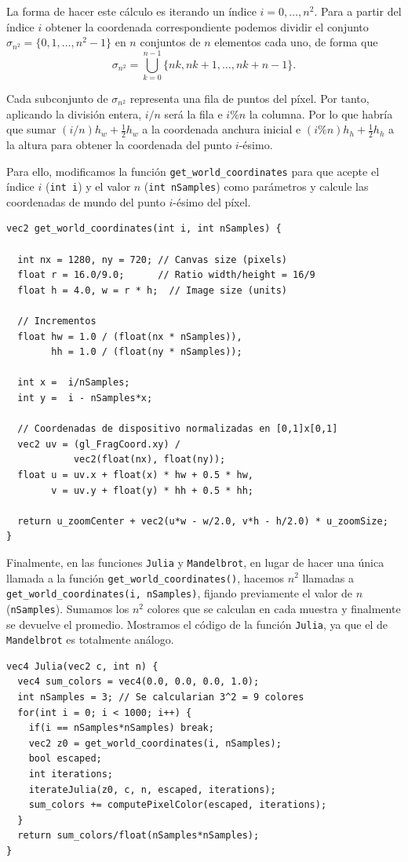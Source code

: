 La forma de hacer este cálculo es iterando un índice $i=0,\dots,n^2$. Para a partir del índice $i$ obtener la coordenada correspondiente podemos dividir el conjunto $\sigma_{n^2}=\{0,1,\dots,n^2-1\}$ en $n$ conjuntos de $n$ elementos cada uno, de forma que
$$
\sigma_{n^2} = \bigcup_{k=0}^{n-1} \{nk, nk+1, \dots, nk+n-1\}.
$$

Cada subconjunto de $\sigma_{n^2}$ representa una fila de puntos del píxel. Por tanto, aplicando la división entera, $i/n$ será la fila e $i\%n$ la columna. Por lo que habría que sumar $(i/n)h_w + \frac{1}{2}h_w$ a la coordenada anchura inicial e $(i\%n)h_h+ \frac{1}{2}h_h$ a la altura para obtener la coordenada del punto $i$-ésimo.

Para ello, modificamos la función \verb|get_world_coordinates| para que acepte el índice $i$ (\verb|int i|) y el valor $n$ (\verb|int nSamples|) como parámetros y calcule las coordenadas de mundo del punto $i$-ésimo del píxel.

\begin{lstlisting}
vec2 get_world_coordinates(int i, int nSamples) {

  int nx = 1280, ny = 720; // Canvas size (pixels)
  float r = 16.0/9.0;      // Ratio width/height = 16/9
  float h = 4.0, w = r * h;  // Image size (units) 

  // Incrementos
  float hw = 1.0 / (float(nx * nSamples)),
        hh = 1.0 / (float(ny * nSamples));

  int x =  i/nSamples;
  int y =  i - nSamples*x;

  // Coordenadas de dispositivo normalizadas en [0,1]x[0,1]
  vec2 uv = (gl_FragCoord.xy) / 
            vec2(float(nx), float(ny));
  float u = uv.x + float(x) * hw + 0.5 * hw,
        v = uv.y + float(y) * hh + 0.5 * hh;
  
  return u_zoomCenter + vec2(u*w - w/2.0, v*h - h/2.0) * u_zoomSize;
}
\end{lstlisting}

Finalmente, en las funciones \verb|Julia| y \verb|Mandelbrot|, en lugar de hacer una única llamada a la función \texttt{get\_world\_coordinates()}, hacemos $n^2$ llamadas a \texttt{get\_world\_coordinates(i, nSamples)}, fijando previamente el valor de $n$ (\verb|nSamples|). Sumamos los $n^2$ colores que se calculan en cada muestra y finalmente se devuelve el promedio. Mostramos el código de la función \verb|Julia|, ya que el de \verb|Mandelbrot| es totalmente análogo.

\begin{lstlisting}
vec4 Julia(vec2 c, int n) {
  vec4 sum_colors = vec4(0.0, 0.0, 0.0, 1.0);
  int nSamples = 3; // Se calcularian 3^2 = 9 colores
  for(int i = 0; i < 1000; i++) {
    if(i == nSamples*nSamples) break;
    vec2 z0 = get_world_coordinates(i, nSamples);
    bool escaped;
    int iterations;
    iterateJulia(z0, c, n, escaped, iterations);
    sum_colors += computePixelColor(escaped, iterations);
  } 
  return sum_colors/float(nSamples*nSamples);
}
\end{lstlisting}

